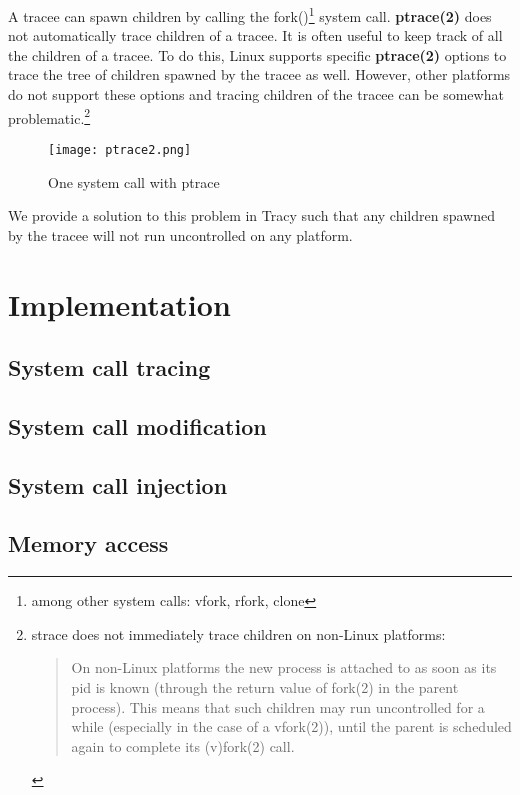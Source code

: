 \documentclass[a4paper, twoside, 10pt, twocolumn]{report}
\begin{document}
A tracee can spawn children by calling the fork()\footnote{among other system
calls: vfork, rfork, clone} system call. \textbf{ptrace(2)} does not
automatically trace children of a tracee. It is often useful to keep track of
all the children of a tracee. To do this, Linux supports specific
\textbf{ptrace(2)} options to trace the tree of children spawned by the tracee
as well. However, other platforms do not support these options and tracing
children of the tracee can be somewhat problematic.\footnote{strace does not
immediately trace children on non-Linux platforms:
\begin{quote}
    On non-Linux platforms the new process is attached to as soon as its pid is
    known (through the return value of fork(2) in the parent process).
    This means that such children may run uncontrolled for a while
    (especially in the case of a vfork(2)), until the parent is scheduled
    again to complete its (v)fork(2)  call.
\end{quote}
}

\begin{figure}
\label{fig2}
\texttt{[image: ptrace2.png]}
\caption{One system call with ptrace}
\end{figure}

We provide a solution to this problem in Tracy such that any children spawned
by the tracee will not run uncontrolled on any platform.

\chapter{Implementation}

\section{System call tracing}


\section{System call modification}

\section{System call injection}

\section{Memory access}
\end{document}
